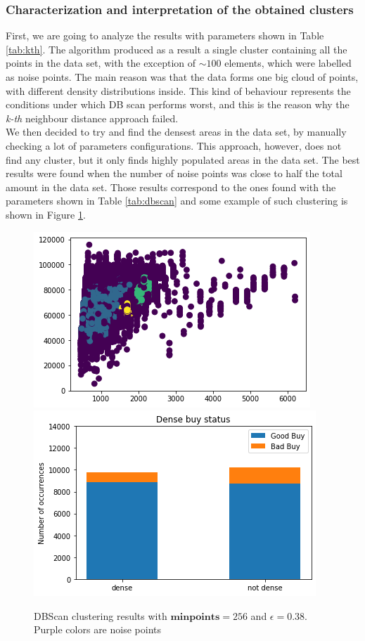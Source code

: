 \documentclass{article}
\begin{document}
	\subsubsection{Characterization and interpretation of the obtained clusters}
	\label{sec:dbscaneval}
	First, we are going to analyze the results with parameters shown in Table \ref{tab:kth}. The algorithm produced as a result a single cluster containing all the points in the data set, with the exception of $\sim 100$ elements, which were labelled as noise points. The main reason was that the data forms one big cloud of points, with different density distributions inside. This kind of behaviour represents the conditions under which DB scan performs worst, and this is the reason why the \emph{k-th} neighbour distance approach failed. \\
	We then decided to try and find the densest areas in the data set, by manually checking a lot of parameters configurations. This approach, however, does not find any cluster, but it only finds highly populated areas in the data set. 
	The best results were found when the number of noise points was close to half the total amount in the data set. Those results correspond to the ones found with the parameters shown in Table \ref{tab:dbscan} and some example of such clustering is shown in Figure \ref{fig:dbscan}.
	
	\begin{figure}[H] 
		\centering
		\includegraphics[width=.40\textwidth]{cazzo}\hspace{1cm}
		\includegraphics[width=.4\textwidth]{bigboi}
		\caption{DBScan clustering results with $\mathbf{minpoints} = 256$ and $\epsilon = 0.38$. Purple colors are noise points}
		\label{fig:dbscan}
	\end{figure}
	
\end{document}
